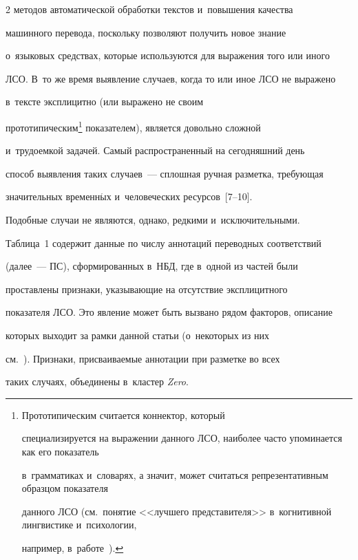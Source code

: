 \begin{multicols}{2}
методов автоматической обработки текстов и~повышения качества 


машинного перевода, поскольку позволяют получить новое знание 


о~языковых средствах, которые используются для выражения того или иного 


ЛСО. В~то же время выявление случаев, когда то или иное ЛСО не выражено 


в~тексте эксплицитно (или выражено не своим 


прототипическим\footnote[3]{Прототипическим считается коннектор, который 


специализируется на выражении данного ЛСО, наиболее часто упоминается как его показатель 


в~грамматиках и~словарях, а значит, может считаться репрезентативным образцом показателя 


данного ЛСО (см.\ понятие <<лучшего представителя>> в~когнитивной лингвистике и~психологии, 


например, в~работе~\cite{6-in}).} показателем), является довольно сложной 


и~трудоемкой задачей. Самый распространенный на сегодняшний день 


способ выявления таких случаев~--- сплошная ручная разметка, требующая 


значительных временн$\acute{\mbox{ы}}$х и~человеческих ресурсов~[7--10].


   


   Подобные случаи не являются, однако, редкими и~исключительными. 


Таблица~1 содержит данные по числу аннотаций переводных соответствий 


(далее~--- ПС), сформированных в~НБД, где в~одной из частей были 


проставлены признаки, ука\-зы\-ва\-ющие на отсутствие эксплицитного 


показателя ЛСО. Это явление может быть вызвано рядом факторов, описание 


которых выходит за рамки данной статьи (о~некоторых из них  


см.~\cite{11-in}). Признаки, присваиваемые аннотации при разметке во всех 


таких случаях, объединены в~кластер \textit{Zero}.


   


   



\end{multicols}
